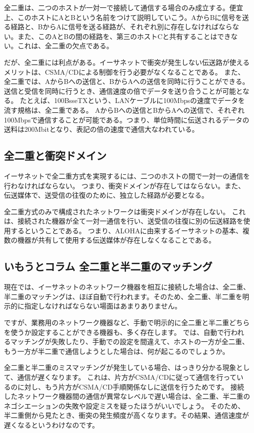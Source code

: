 全二重は、二つのホストが一対一で接続して通信する場合のみ成立する。便宜上、このホストにAとBという名前をつけて説明していこう。AからBに信号を送る経路と、BからAに信号を送る経路が、それぞれ別に存在しなければならない。また、このAとBの間の経路を、第三のホストCと共有することはできない。これは、全二重の欠点である。

だが、全二重には利点がある。イーサネットで衝突が発生しない伝送路が使えるメリットは、CSMA/CDによる制御を行う必要がなくなることである。
また、全二重では、AからBへの送信と、BからAへの送信を同時に行うことができる。送信と受信を同時に行うとき、通信速度の倍でデータを送り合うことが可能となる。
たとえば、100BsseTXという、LANケーブルに100Mbpsの速度でデータを流す規格は、全二重である。
AからBへの送信とBからAへの送信で、それぞれ100Mbpsで通信することが可能である。つまり、単位時間に伝送されるデータの送料は200Mbitとなり、表記の倍の速度で通信大なわれている。

\subsection{全二重と衝突ドメイン}

イーサネットで全二重方式を実現するには、二つのホストの間で一対一の通信を行わなければならない。
つまり、衝突ドメインが存在してはならない。また、伝送媒体で、送受信の往復のために、独立した経路が必要となる。

全二重方式のみで構成されたネットワークは衝突ドメインが存在しない。
これは、接続された機器が全て一対一通信を行い、送受信の往復に別の伝送経路を使用するということである。
つまり、ALOHAに由来するイーサネットの基本、複数の機器が共有して使用する伝送媒体が存在しなくなることである。



\subsection*{いもうとコラム 全二重と半二重のマッチング}
現在では、イーサネットのネットワーク機器を相互に接続した場合は、全二重、半二重のマッチングは、ほぼ自動で行われます。そのため、全二重、半二重を明示的に指定しなければならない場面はあまりありません。

ですが、業務用のネットワーク機器など、手動で明示的に全二重と半二重どちらを使うか設定することができる機器も、多く存在します。
では、自動で行われるマッチングが失敗したり、手動での設定を間違えて、ホストの一方が全二重、もう一方が半二重で通信しようとした場合は、何が起こるのでしょうか。

全二重と半二重のミスマッチングが発生している場合、はっきり分かる現象として、通信が遅くなります。
これは、片方がCSMA/CDに従って通信を行っているのに対し、もう片方がCSMA/CD手順関係なしに送信を行うためです。
接続したネットワーク機器間の通信が異常なレベルで遅い場合は、全二重、半二重のネゴシエーションの失敗や設定ミスを疑ったほうがいいでしょう。
そのため、半二重側から見たとき、衝突の発生頻度が高くなります。その結果、通信速度が遅くなるというわけなのです。

